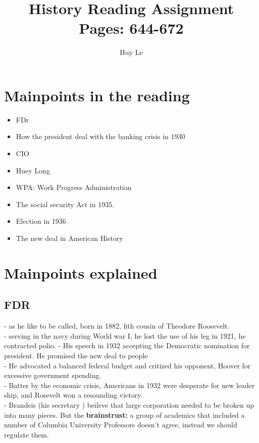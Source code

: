 \documentclass{article}
\begin{document}
\title{History Reading Assignment Pages: 644-672 }
\author{Huy Le}
\maketitle
\section{Mainpoints in the reading}
\begin{itemize}
\item FDr
\item How the president deal with the banking crisis in 1930
\item CIO
\item Huey Long
\item WPA: Work Progress Administration
\item The social security Act in 1935.
\item Election in 1936
\item The new deal in American History
\end{itemize}

\section {Mainpoints explained}
\subsection{FDR}
- as he like to be called, born in 1882, fith cousin of Theodore Roosevelt. \\
- serving in the navy during World war I, he lost the use of his leg in 1921, he contracted polio.
- His speech in 1932 accepting the Democratic nomination for president. He promised the new deal to people\\
- He advocated a balanced federal budget and critized his opponent, Hoover for excessive government spending. \\
- Batter by the economic crisis, Americans in 1932 were desperate for new leader ship, and Rosevelt won a resounding victory.\\
- Brandeis (his secretary ) beileve that large corporation needed to be broken
up into many pieces. But the \textbf{brainstrust: } a group of academics that
included a number of Columbia University Professors doesn't agree, instead we
should regulate them.
\end{document}
